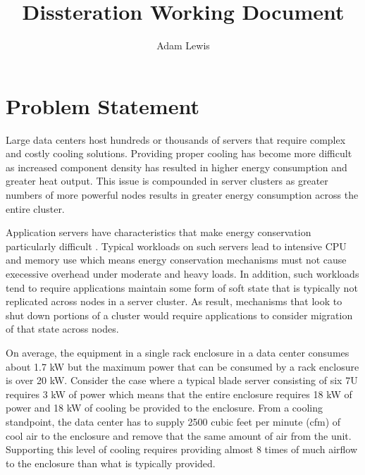 \documentclass[times, 10pt,onecolumn]{article}
\begin{document}
\title{Dissteration Working Document}
\author[*]{Adam Lewis}
\maketitle
\thispagestyle{empty}
\begin{abstract}

\end{abstract}
\section{Problem Statement}
\label{Problem Statement}
Large data centers host hundreds or thousands of servers that require complex
and costly cooling solutions.  Providing proper cooling has become more
difficult as increased component density has resulted in higher energy
consumption and greater heat output.   This issue is compounded in server
clusters as greater numbers of more powerful nodes results in greater energy
consumption across the entire cluster.

Application servers have characteristics that make energy conservation
particularly difficult \cite{Bianchini2004}.  Typical workloads on such
servers lead to intensive CPU and memory use which means energy conservation
mechanisms must not cause execessive overhead under moderate and heavy loads.
In addition, such workloads tend to require applications maintain some form of
soft state that is typically not replicated across nodes in a server
cluster. As result, mechanisms that look to shut down portions of a cluster
would require applications to consider migration of that state across nodes.

On average, the equipment in a single rack enclosure in a data center consumes
about 1.7 kW but the maximum power that can be consumed by a rack enclosure is
over 20 kW. \cite{APC2007a} Consider the case where a typical blade server
consisting of six 7U requires 3 kW of power which means that the entire
enclosure requires 18 kW of power and 18 kW of cooling be provided to the
enclosure. From a cooling standpoint, the data center has to supply 2500 cubic
feet per minute (cfm) of cool air to the enclosure and remove that the same
amount of air from the unit.  Supporting this level of cooling requires
providing almost 8 times of much airflow to the enclosure than what is
typically provided.
\end{document}
